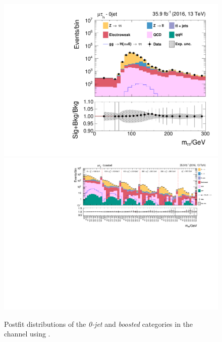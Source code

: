 \begin{figure}[h!]
    \centering
        \includegraphics[width=.5\textwidth]{Figures/statana/Postfit_JEC_jdphi/postfit_fit_s_htt_mt_1_13TeV.pdf}\\
        \includegraphics[width=\textwidth]{Figures/statana/Postfit_JEC_jdphi/postfit_fit_s_htt_mt_2_13TeV.pdf}    
    \caption{Postfit distributions of the \textit{0-jet} and \textit{boosted} categories in the \mutau{} channel  using \jdphi{}.}
\end{figure}
